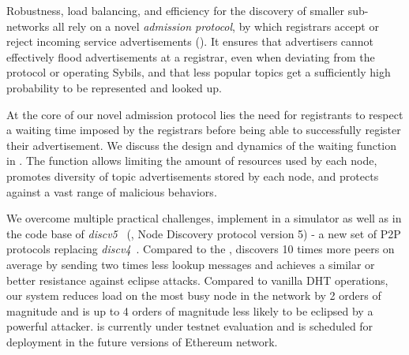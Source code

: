 Robustness, load balancing, and efficiency for the discovery of smaller sub-networks all rely on a novel \emph{admission protocol}, by which registrars accept or reject incoming service advertisements ().
It ensures that advertisers cannot effectively flood advertisements at a registrar, even when deviating from the protocol or operating Sybils, and that less popular topics get a sufficiently high probability to be represented and looked up. 

At the core of our novel admission protocol lies the need for registrants to respect a waiting time imposed by the registrars before being able to successfully register their advertisement.
We discuss the design and dynamics of the waiting function in .
The function allows limiting the amount of resources used by each node, promotes diversity of topic advertisements stored by each node, and protects against a vast range of malicious behaviors.


We overcome multiple practical challenges, implement \sysname in a simulator as well as in the code base of \emph{discv5}~\cite{discv5}  (\ie, Node Discovery protocol version 5) - a new set of P2P protocols replacing \emph{discv4}~\cite{discv4}. 
Compared to the \discv, \sysname discovers 10 times more peers on average by sending two times less lookup messages and achieves a similar or better resistance against eclipse attacks. 
Compared to vanilla DHT operations, our system reduces load on the most busy node in the network by 2 orders of magnitude and is up to 4 orders of magnitude less likely to be eclipsed by a powerful attacker.   
\sysname is currently under testnet evaluation and is scheduled for deployment in the future versions of Ethereum network. 
